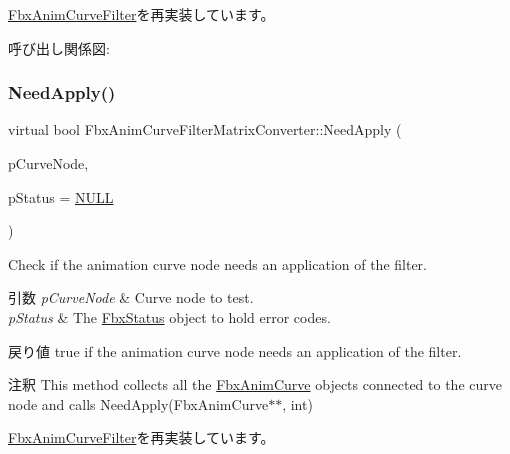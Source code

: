 \hyperlink{class_fbx_anim_curve_filter_a6b210eca45b745cf070c46bfaaf3e5b2}{Fbx\+Anim\+Curve\+Filter}を再実装しています。

呼び出し関係図\+:
\mbox{\label{class_fbx_anim_curve_filter_matrix_converter_a00f04a303254479eef1aa3bfbe0643d8}} 
\subsubsection{\texorpdfstring{Need\+Apply()}{NeedApply()}\hspace{0.1cm}{\footnotesize\ttfamily [2/6]}}
{\footnotesize\ttfamily virtual bool Fbx\+Anim\+Curve\+Filter\+Matrix\+Converter\+::\+Need\+Apply (\begin{DoxyParamCaption}\item[{\hyperlink{class_fbx_anim_curve_node}{Fbx\+Anim\+Curve\+Node} \&}]{p\+Curve\+Node,  }\item[{\hyperlink{class_fbx_status}{Fbx\+Status} $\ast$}]{p\+Status = {\ttfamily \hyperlink{fbxarch_8h_a070d2ce7b6bb7e5c05602aa8c308d0c4}{N\+U\+LL}} }\end{DoxyParamCaption})\hspace{0.3cm}{\ttfamily [virtual]}}

Check if the animation curve node needs an application of the filter. 
\begin{DoxyParams}{引数}
{\em p\+Curve\+Node} & Curve node to test. \\
\hline
{\em p\+Status} & The \hyperlink{class_fbx_status}{Fbx\+Status} object to hold error codes. \\
\hline
\end{DoxyParams}
\begin{DoxyReturn}{戻り値}
{\ttfamily true} if the animation curve node needs an application of the filter. 
\end{DoxyReturn}
\begin{DoxyRemark}{注釈}
This method collects all the \hyperlink{class_fbx_anim_curve}{Fbx\+Anim\+Curve} objects connected to the curve node and calls Need\+Apply(\+Fbx\+Anim\+Curve$\ast$$\ast$, int) 
\end{DoxyRemark}


\hyperlink{class_fbx_anim_curve_filter_a2a88d855d34bb1f2f22ca8386020b33a}{Fbx\+Anim\+Curve\+Filter}を再実装しています。

